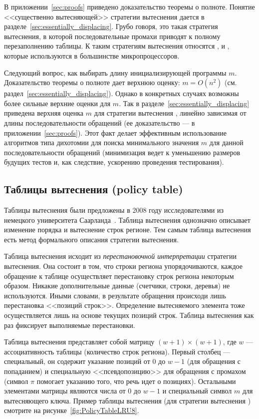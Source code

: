 В приложении~\ref{sec:proofs} приведено доказательство теоремы о полноте. Понятие <<существенно вытесняющей>> стратегии вытеснения дается в разделе~\ref{sec:essentially_displacing}. Грубо говоря, это такая стратегия вытеснения, в которой последовательные промахи приводят к полному перезаполнению таблицы. К таким стратегиям вытеснения относятся \LRU, \FIFO и \PseudoLRU, которые используются в большинстве микропроцессоров.

Следующий вопрос, как выбирать длину инициализирующей программы $m$. %
Доказательство теоремы о полноте дает верхнюю оценку: $m = O(n^2)$ (см. раздел~\ref{sec:essentially_displacing}). Однако в конкретных случаях возможны более сильные верхние оценки для $m$. Так в разделе~\ref{sec:essentially_displacing} приведена верхняя оценка $m$ для стратегии вытеснения \LRU, линейно зависимая от длины последовательности обращений (ее доказательство --- в приложении~\ref{sec:proofs}). Этот факт делает эффективным использование алгоритмов типа дихотомии для поиска минимального значения $m$ для данной последовательности обращений (минимизация ведет к уменьшению размеров будущих тестов и, как следствие, ускорению проведения тестирования).

\subsection{Таблицы вытеснения (policy table)}

Таблицы вытеснения были предложены в 2008 году исследователями из немецкого университета Саарланда~\cite{policy_tables}. Таблица вытеснения однозначно описывает изменение порядка и вытеснение строк регионе. Тем самым таблица вытеснения есть метод формального описания стратегии вытеснения.

Таблица вытеснения исходит из \emph{перестановочной интерпретации} стратегии
вытеснения. Она состоит в том, что строки региона упорядочиваются, каждое
обращение к таблице осуществляет перестановку строк региона некоторым образом.
Никакие дополнительные данные (счетчики, строки, деревья) не используются. Иными
словами, в результате обращения происходи лишь перестановка <<позиций строк>>.
Определение вытесняемого элемента тоже осуществляется лишь на основе текущих
позиций строк. Таблица вытеснения как раз фиксирует выполняемые перестановки.

Таблица вытеснения представляет собой матрицу $(w{+}1) \times (w{+}1)$, где $w$
--- ассоциативность таблицы (количество строк региона). Первый столбец ---
специальный, он содержит указание позиций от 0 до $w{-}1$ (для обращения с
попаданием) и
специальную <<псевдопозицию>> для обращения с промахом (символ $\pi$ помогает
указанию того, что речь идет о позициях). Остальными элементами
матрицы являются числа от 0 до $w{-}1$ и специальный символ $m$ для
вытесняющего ключа. Пример таблицы вытеснения (для стратегии
вытеснения \LRU) смотрите на рисунке~\ref{fig:PolicyTableLRU8}.

